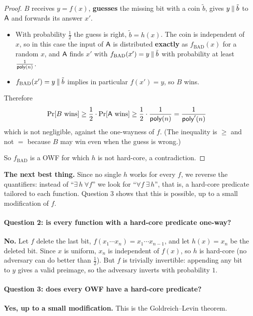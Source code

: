 \begin{proof}
  $B$ receives $y = f(x)$, \textbf{guesses} the missing bit with a coin $\tilde b$, gives $y \mathbin{\Vert} \tilde b$ to $\mathsf{A}$ and forwards its answer $x'$.
  \begin{itemize}
    \item With probability $\frac{1}{2}$ the guess is right, $\tilde b = h(x)$. The coin is independent of $x$, so in this case the input of $\mathsf{A}$ is distributed \textbf{exactly} as $f_{\mathrm{BAD}}(x)$ for a random $x$, and $\mathsf{A}$ finds $x'$ with $f_{\mathrm{BAD}}(x') = y \mathbin{\Vert} \tilde b$ with probability at least $\frac{1}{\mathsf{poly}(n)}$.
    \item $f_{\mathrm{BAD}}(x') = y \mathbin{\Vert} \tilde b$ implies in particular $f(x') = y$, so $B$ wins.
  \end{itemize}
  Therefore
  \[
    \Pr[B \text{ wins}] \geq \frac{1}{2} \cdot \Pr[\mathsf{A} \text{ wins}] \geq \frac{1}{2} \cdot \frac{1}{\mathsf{poly}(n)} = \frac{1}{\mathsf{poly}'(n)}
  \]
  which is not negligible, against the one-wayness of $f$. (The inequality is $\geq$ and not $=$ because $B$ may win even when the guess is wrong.)

  So $f_{\mathrm{BAD}}$ is a OWF for which $h$ is not hard-core, a contradiction.
\end{proof}

\textbf{The next best thing.} Since no single $h$ works for every $f$, we reverse the quantifiers: instead of ``$\exists\, h\ \forall f$'' we look for ``$\forall f\ \exists\, h$'', that is, a hard-core predicate tailored to each function. Question 3 shows that this is possible, up to a small modification of $f$.

\paragraph{Question 2: is every function with a hard-core predicate one-way?} \textbf{No.} Let $f$ delete the last bit, $f(x_1 \cdots x_n) = x_1 \cdots x_{n-1}$, and let $h(x) = x_n$ be the deleted bit. Since $x$ is uniform, $x_n$ is independent of $f(x)$, so $h$ is hard-core (no adversary can do better than $\frac{1}{2}$). But $f$ is trivially invertible: appending any bit to $y$ gives a valid preimage, so the adversary inverts with probability $1$.

\paragraph{Question 3: does every OWF have a hard-core predicate?} \textbf{Yes, up to a small modification.} This is the Goldreich--Levin theorem.

